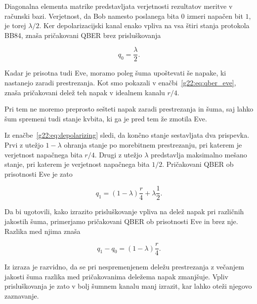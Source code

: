     Diagonalna elementa matrike predstavljata
    verjetnosti rezultatov meritve v računski bazi.
    Verjetnost, da Bob namesto poslanega bita $0$
    izmeri napačen bit $1$, je torej $\lambda/2$.
    Ker depolarizacijski kanal enako vpliva na
    vsa štiri stanja protokola BB84, znaša
    pričakovani QBER brez prisluškovanja

    \begin{equation}
        q_0=\frac{\lambda}{2}.
        \label{g22:eq:qber_no_eve}
    \end{equation}



    Kadar je prisotna tudi Eve, moramo poleg šuma upoštevati
    še napake, ki nastanejo zaradi prestrezanja. Kot smo
    pokazali v enačbi~\eqref{g22:eq:qber_eve}, znaša
    pričakovani delež teh napak v idealnem kanalu $r/4$.

    
    Pri tem ne moremo preprosto sešteti napak zaradi
    prestrezanja in šuma, saj lahko šum spremeni tudi
    stanje kvbita, ki ga je pred tem že zmotila Eve.
    
    Iz enačbe~\eqref{g22:eq:depolarizing} sledi, da
    končno stanje sestavljata dva prispevka.
    Prvi z utežjo $1-\lambda$ ohranja stanje po
    morebitnem prestrezanju, pri katerem je
    verjetnost napačnega bita $r/4$. Drugi z utežjo
    $\lambda$ predstavlja maksimalno mešano stanje,
    pri katerem je verjetnost napačnega bita $1/2$.
    Pričakovani QBER ob prisotnosti Eve je zato
    
    \begin{equation}
        q_1 = (1-\lambda)\frac{r}{4}
            + \lambda\frac{1}{2}.
        \label{g22:eq:qber_with_eve}
    \end{equation}
    




Da bi ugotovili, kako izrazito prisluškovanje vpliva
na delež napak pri različnih jakostih šuma,
primerjamo pričakovani QBER ob prisotnosti Eve
in brez nje. Razlika med njima znaša

\begin{equation}
    q_1-q_0=(1-\lambda)\frac{r}{4}.
    \label{g22:eq:qber_difference}
\end{equation}

Iz izraza je razvidno, da se pri nespremenjenem
deležu prestrezanja z večanjem jakosti šuma
razlika med pričakovanima deležema napak zmanjšuje.
Vpliv prisluškovanja je zato v bolj šumnem kanalu
manj izrazit, kar lahko oteži njegovo zaznavanje.



